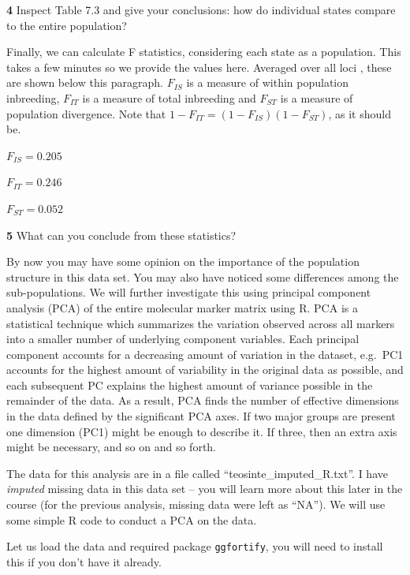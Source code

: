 \documentclass[
]{book}
\makeatletter
\newenvironment{kframe}{%
\medskip{}
\setlength{\fboxsep}{.8em}
 \def\at@end@of@kframe{}%
 \ifinner\ifhmode%
  \def\at@end@of@kframe{\end{minipage}}%
  \begin{minipage}{\columnwidth}%
 \fi\fi%
 \def\FrameCommand##1{\hskip\@totalleftmargin \hskip-\fboxsep
 \colorbox{shadecolor}{##1}\hskip-\fboxsep
     \hskip-\linewidth \hskip-\@totalleftmargin \hskip\columnwidth}%
 \MakeFramed {\advance\hsize-\width
   \@totalleftmargin\z@ \linewidth\hsize
   \@setminipage}}%
 {\par\unskip\endMakeFramed%
 \at@end@of@kframe}
\newenvironment{rmdblock}[1]
  {
  \begin{itemize}
  \renewcommand{\labelitemi}{
    \raisebox{-.7\height}[0pt][0pt]{
      {\setkeys{Gin}{width=3em,keepaspectratio}\texttt{[image: images/\#1]}}
    }
  }
  \setlength{\fboxsep}{1em}
  \begin{kframe}
  \item
  }
  {
  \end{kframe}
  \end{itemize}
  }
\newenvironment{rmdquiz}
  {\begin{rmdblock}{quiz}}
  {\end{rmdblock}}
\makeatother
\begin{document}
\begin{rmdquiz}
\textbf{4} Inspect Table 7.3 and give your conclusions: how do individual states compare to the entire population?\\
\end{rmdquiz}

Finally, we can calculate F statistics, considering each state as a population. This takes a few minutes so we provide the values here. Averaged over all loci , these are shown below this paragraph. \(F_{IS}\) is a measure of within population inbreeding, \(F_{IT}\) is a measure of total inbreeding and \(F_{ST}\) is a measure of population divergence. Note that \(1-F_{IT} = (1-F_{IS})(1-F_{ST})\), as it should be.

\(F_{IS} = 0.205\)

\(F_{IT} = 0.246\)

\(F_{ST}= 0.052\)

\begin{rmdquiz}
\textbf{5} What can you conclude from these statistics?
\end{rmdquiz}

By now you may have some opinion on the importance of the population structure in this data set. You may also have noticed some differences among the sub-populations. We will further investigate this using principal component analysis (PCA) of the entire molecular marker matrix using R. PCA is a statistical technique which summarizes the variation observed across all markers into a smaller number of underlying component variables. Each principal component accounts for a decreasing amount of variation in the dataset, e.g.~PC1 accounts for the highest amount of variability in the original data as possible, and each subsequent PC explains the highest amount of variance possible in the remainder of the data. As a result, PCA finds the number of effective dimensions in the data defined by the significant PCA axes. If two major groups are present one dimension (PC1) might be enough to describe it. If three, then an extra axis might be necessary, and so on and so forth.

The data for this analysis are in a file called ``teosinte\_imputed\_R.txt''. I have \emph{imputed} missing data in this data set -- you will learn more about this later in the course (for the previous analysis, missing data were left as ``NA''). We will use some simple R code to conduct a PCA on the data.

Let us load the data and required package \texttt{ggfortify}, you will need to install this if you don't have it already.
\end{document}
